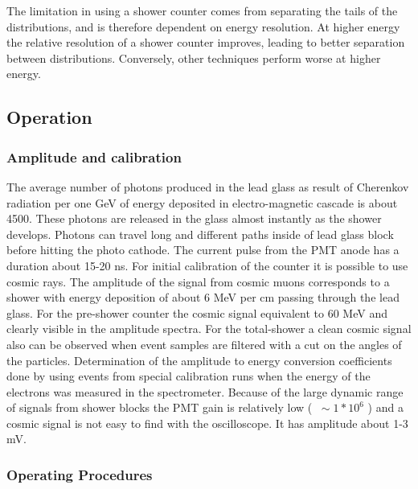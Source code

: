 \documentclass[12pt]{article}
\begin{document}
The limitation in using a shower counter comes from separating the
tails of the distributions, and is therefore dependent on energy
resolution.  At higher energy the relative resolution of a shower
counter improves, leading to better separation between distributions.
Conversely, other techniques perform worse at higher energy.

\subsection{Operation}
\subsubsection{Amplitude and calibration}

The average number of photons produced in the lead glass as result of
Cherenkov radiation per one GeV of energy deposited in
electro-magnetic cascade is about 4500. These photons are released in
the glass almost instantly as the shower develops. Photons can travel
long and different paths inside of lead glass block before hitting the
photo cathode. The current pulse from the PMT anode has a duration
about 15-20 ns. For initial calibration of the counter it is possible
to use cosmic rays. The amplitude of the signal from cosmic muons
corresponds to a shower with energy deposition of about 6 MeV per cm
passing through the lead glass. For the pre-shower counter the cosmic
signal equivalent to 60 MeV and clearly visible in the amplitude
spectra. For the total-shower a clean cosmic signal also can be
observed when event samples are filtered with a cut on the angles of
the particles.  Determination of the amplitude to energy conversion
coefficients done by using events from special calibration runs when
the energy of the electrons was measured in the spectrometer. Because
of the large dynamic range of signals from shower blocks the PMT gain
is relatively low ( $~\sim 1*10^6$ ) and a cosmic signal is not easy
to find with the oscilloscope. It has amplitude about 1-3 mV.

\subsubsection{Operating Procedures}
\end{document}
